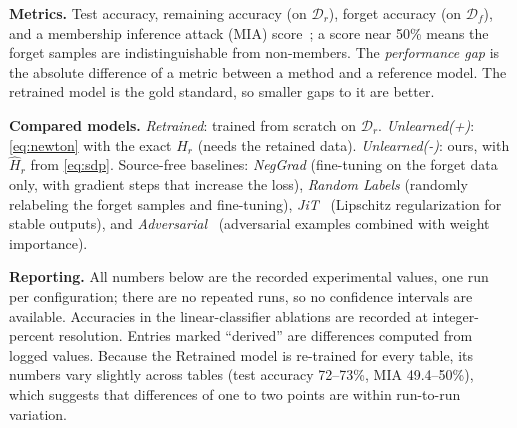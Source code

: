 \documentclass[10pt,twocolumn,letterpaper]{article}
\begin{document}
\noindent\textbf{Metrics.} Test accuracy, remaining accuracy (on $\mathcal D_r$), forget accuracy (on $\mathcal D_f$), and a membership inference attack (MIA) score~\cite{shokri2017membership}; a score near 50\% means the forget samples are indistinguishable from non-members. The \emph{performance gap} is the absolute difference of a metric between a method and a reference model. The retrained model is the gold standard, so smaller gaps to it are better.

\noindent\textbf{Compared models.} \emph{Retrained}: trained from scratch on $\mathcal D_r$. \emph{Unlearned(+)}: \cref{eq:newton} with the exact $H_r$ (needs the retained data). \emph{Unlearned(-)}: ours, with $\widehat H_r$ from \cref{eq:sdp}. Source-free baselines: \emph{NegGrad} (fine-tuning on the forget data only, with gradient steps that increase the loss), \emph{Random Labels} (randomly relabeling the forget samples and fine-tuning), \emph{JiT}~\cite{foster2024information} (Lipschitz regularization for stable outputs), and \emph{Adversarial}~\cite{cha2024learning} (adversarial examples combined with weight importance).

\noindent\textbf{Reporting.} All numbers below are the recorded experimental values, one run per configuration; there are no repeated runs, so no confidence intervals are available. Accuracies in the linear-classifier ablations are recorded at integer-percent resolution. Entries marked ``derived'' are differences computed from logged values. Because the Retrained model is re-trained for every table, its numbers vary slightly across tables (test accuracy 72--73\%, MIA 49.4--50\%), which suggests that differences of one to two points are within run-to-run variation.
\end{document}
